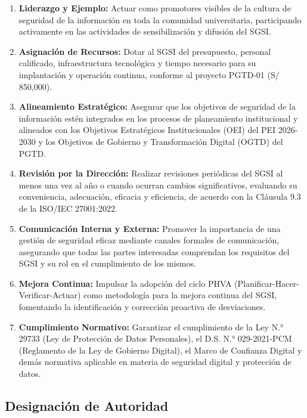 \documentclass[10pt,letterpaper]{article}
\begin{document}
\begin{enumerate}
\def\labelenumi{\arabic{enumi}.}
\item
  \textbf{Liderazgo y Ejemplo:} Actuar como promotores visibles de la
  cultura de seguridad de la información en toda la comunidad
  universitaria, participando activamente en las actividades de
  sensibilización y difusión del SGSI.
\item
  \textbf{Asignación de Recursos:} Dotar al SGSI del presupuesto,
  personal calificado, infraestructura tecnológica y tiempo necesario
  para su implantación y operación continua, conforme al proyecto
  PGTD-01 (S/ 850,000).
\item
  \textbf{Alineamiento Estratégico:} Asegurar que los objetivos de
  seguridad de la información estén integrados en los procesos de
  planeamiento institucional y alineados con los Objetivos Estratégicos
  Institucionales (OEI) del PEI 2026-2030 y los Objetivos de Gobierno y
  Transformación Digital (OGTD) del PGTD.
\item
  \textbf{Revisión por la Dirección:} Realizar revisiones periódicas del
  SGSI al menos una vez al año o cuando ocurran cambios significativos,
  evaluando su conveniencia, adecuación, eficacia y eficiencia, de
  acuerdo con la Cláusula 9.3 de la ISO/IEC 27001:2022.
\item
  \textbf{Comunicación Interna y Externa:} Promover la importancia de
  una gestión de seguridad eficaz mediante canales formales de
  comunicación, asegurando que todas las partes interesadas comprendan
  los requisitos del SGSI y su rol en el cumplimiento de los mismos.
\item
  \textbf{Mejora Continua:} Impulsar la adopción del ciclo PHVA
  (Planificar-Hacer-Verificar-Actuar) como metodología para la mejora
  continua del SGSI, fomentando la identificación y corrección proactiva
  de desviaciones.
\item
  \textbf{Cumplimiento Normativo:} Garantizar el cumplimiento de la Ley
  N.° 29733 (Ley de Protección de Datos Personales), el D.S. N.°
  029-2021-PCM (Reglamento de la Ley de Gobierno Digital), el Marco de
  Confianza Digital y demás normativa aplicable en materia de seguridad
  digital y protección de datos.
\end{enumerate}

\subsection{Designación de Autoridad}\label{designaciuxf3n-de-autoridad}
\end{document}
